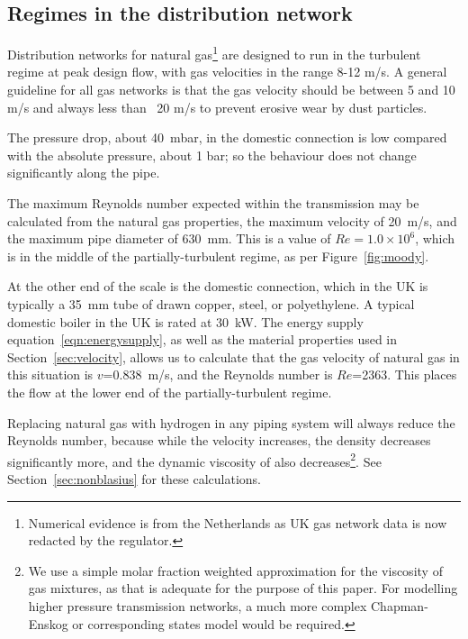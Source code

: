 \documentclass[5p]{elsarticle} %
\begin{document}
\subsection{Regimes in the distribution network }
\label{sec:service}

Distribution networks for natural gas\footnote{Numerical evidence is from the Netherlands\citep{Schouten2004} as UK gas network data is now redacted by the regulator.
} are designed to run in the turbulent regime at peak design flow, with gas velocities in the range 8-12 m/s. 
A general guideline for all gas networks is that the gas velocity should be between 5 and 10 m/s and always less than ~20 m/s to prevent erosive wear by dust particles\citep{Schouten2004,Tabkhi2008,Ejo2020, Abbas2021}.

The pressure drop, about 40~mbar, in the domestic connection is low compared with the absolute pressure, about 1 bar; so the behaviour does not change significantly along the pipe.

The maximum Reynolds number expected within the transmission may be calculated from the natural gas properties, the maximum velocity of 20~m/s, and the maximum pipe diameter of 630~mm\citep{GPS2008}.
This is a value of $Re = 1.0\times10^6$, which is in the middle of the partially-turbulent regime, as per Figure~\ref{fig:moody}.

At the other end of the scale is the domestic connection, which in the UK is typically a 35~mm tube of drawn copper, steel, or polyethylene\citep{dodds2013}.
A typical domestic boiler in the UK is rated at 30~kW\citep{GASTEC2009, Bennett2020}.
The energy supply equation~\eqref{eqn:energysupply}, as well as the material properties used in Section~\ref{sec:velocity}, allows us to calculate that the gas velocity of natural gas in this situation is $v$=0.838~m/s, and the Reynolds number is $Re$=2363.
This places the flow at the lower end of the partially-turbulent regime.

Replacing natural gas with hydrogen in any piping system will always reduce the Reynolds number, because while the velocity increases, the density decreases significantly more, and the dynamic viscosity of also decreases\footnote{We use a simple molar fraction weighted approximation for the viscosity of gas mixtures, as that is adequate for the purpose of this paper. For modelling higher pressure transmission networks, a much more complex Chapman-Enskog or corresponding states\citep{coolprop} model would be required.}.
See Section~\ref{sec:nonblasius} for these calculations.
\end{document}
